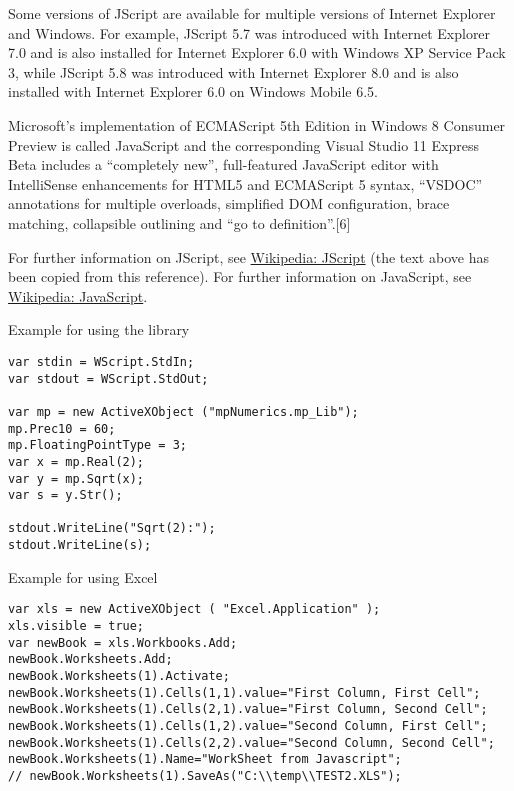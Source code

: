 \vpara
Some versions of JScript are available for multiple versions of Internet Explorer and Windows. For example, JScript 5.7 was introduced with Internet Explorer 7.0 and is also installed for Internet Explorer 6.0 with Windows XP Service Pack 3, while JScript 5.8 was introduced with Internet Explorer 8.0 and is also installed with Internet Explorer 6.0 on Windows Mobile 6.5.

\vpara
Microsoft's implementation of ECMAScript 5th Edition in Windows 8 Consumer Preview is called JavaScript and the corresponding Visual Studio 11 Express Beta includes a “completely new”, full-featured JavaScript editor with IntelliSense enhancements for HTML5 and ECMAScript 5 syntax, “VSDOC” annotations for multiple overloads, simplified DOM configuration, brace matching, collapsible outlining and “go to definition”.[6]

\vpara
For further information on JScript, see \href{http://en.wikipedia.org/wiki/JScript}{Wikipedia: JScript} (the text above has been copied from this reference).
For further information on JavaScript, see \href{http://en.wikipedia.org/wiki/JavaScript}{Wikipedia: JavaScript}.


\vpara
Example for using the library

\begin{lstlisting}
var stdin = WScript.StdIn;
var stdout = WScript.StdOut;

var mp = new ActiveXObject ("mpNumerics.mp_Lib");
mp.Prec10 = 60;
mp.FloatingPointType = 3;
var x = mp.Real(2);
var y = mp.Sqrt(x);
var s = y.Str();

stdout.WriteLine("Sqrt(2):");
stdout.WriteLine(s);
\end{lstlisting}


\vpara
Example for using Excel

\begin{lstlisting}
var xls = new ActiveXObject ( "Excel.Application" );
xls.visible = true;
var newBook = xls.Workbooks.Add;
newBook.Worksheets.Add;
newBook.Worksheets(1).Activate;
newBook.Worksheets(1).Cells(1,1).value="First Column, First Cell";
newBook.Worksheets(1).Cells(2,1).value="First Column, Second Cell";
newBook.Worksheets(1).Cells(1,2).value="Second Column, First Cell";
newBook.Worksheets(1).Cells(2,2).value="Second Column, Second Cell";
newBook.Worksheets(1).Name="WorkSheet from Javascript";
// newBook.Worksheets(1).SaveAs("C:\\temp\\TEST2.XLS");
\end{lstlisting}




